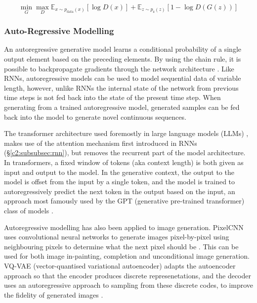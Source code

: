 \begin{equation}
\label{eq:gan}
\min_{G}\max_{D}\mathbb{E}_{x\sim p_{\text{data}}(x)}[\log{D(x)}] + \mathbb{E}_{z\sim p_{\text{z}}(z)}[1 - \log{D(G(z))}]
\end{equation}

\subsubsection{Auto-Regressive Modelling}
\label{c2:subsubsec:autoregressive}

An autoregressive generative model learns a conditional probability of a single output element based on the preceding elements. 
By using the chain rule, it is possible to backpropagate gradients through the network architecture \cite{larochelle2011neural}. 
Like RNNs, autoregressive models can be used to model sequential data of variable length, however, unlike RNNs the internal state of the network from previous time steps is not fed back into the state of the present time step. 
When generating from a trained autoregressive model, generated samples can be fed back into the model to generate novel continuous sequences.

The transformer architecture used foremostly in large language models (LLMs) \citep{vaswani2017attention}, makes use of the attention mechanism first introduced in RNNs \citep{bahdanau2014neural} (\S \ref{c2:subsubsec:rnn}), but removes the recurrent part of the model architecture.
In transformers, a fixed window of tokens (aka context length) is both given as input and output to the model.
In the generative context, the output to the model is offset from the input by a single token, and the model is trained to autoregressively predict the next token in the output based on the input, an approach most famously used by the GPT (generative pre-trained transformer) class of models \citep{radford2018improving, radford2019language,brown2020language}.

Autoregressive modelling has also been applied to image generation.
PixelCNN uses convolutional neural networks to generate images pixel-by-pixel using neighbouring pixels to determine what the next pixel should be \citep{van2016conditional}.
This can be used for both image in-painting, completion and unconditional image generation.
VQ-VAE (vector-quantised variational autoencoder) adapts the autoencoder approach so that the encoder produces discrete represenetations, and the decoder uses an autoregressive approach to sampling from these discrete codes, to improve the fidelity of generated images \citep{van2017neural}. 

